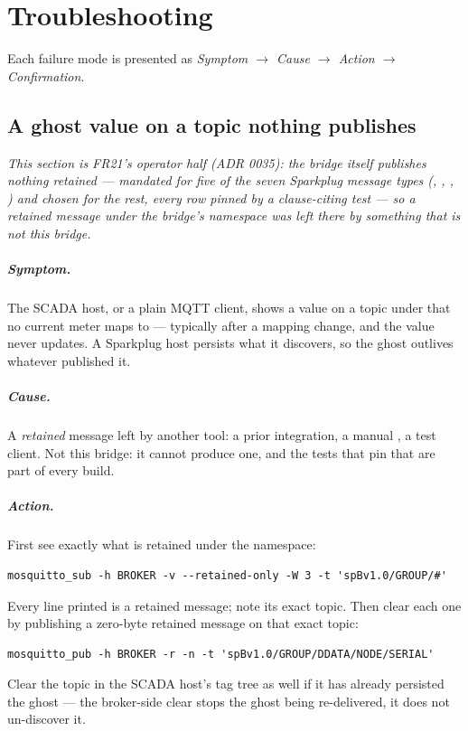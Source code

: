 \chapter{Troubleshooting}
\label{ch:trouble}

Each failure mode is presented as \emph{Symptom $\rightarrow$ Cause $\rightarrow$ Action
$\rightarrow$ Confirmation}.

\section{A ghost value on a topic nothing publishes}
\label{sec:trouble-retained-ghost}

\emph{This section is FR21's operator half (ADR 0035): the bridge itself publishes
nothing retained --- mandated for five of the seven Sparkplug message types
(, , ,
) and chosen for the rest, every row pinned by a clause-citing test ---
so a retained message under the bridge's namespace was left there by something that is not
this bridge.}

\paragraph{Symptom.} The SCADA host, or a plain MQTT client, shows a value on a topic under
 that no current meter maps to --- typically after a
mapping change, and the value never updates. A Sparkplug host persists what it discovers, so
the ghost outlives whatever published it.

\paragraph{Cause.} A \emph{retained} message left by another tool: a prior integration, a
manual , a test client. Not this bridge: it cannot produce one, and
the tests that pin that are part of every build.

\paragraph{Action.} First see exactly what is retained under the namespace:
\begin{verbatim}
mosquitto_sub -h BROKER -v --retained-only -W 3 -t 'spBv1.0/GROUP/#'
\end{verbatim}
Every line printed is a retained message; note its exact topic. Then clear each one by
publishing a zero-byte retained message on that exact topic:
\begin{verbatim}
mosquitto_pub -h BROKER -r -n -t 'spBv1.0/GROUP/DDATA/NODE/SERIAL'
\end{verbatim}
Clear the topic in the SCADA host's tag tree as well if it has already persisted the ghost
--- the broker-side clear stops the ghost being re-delivered, it does not un-discover it.

